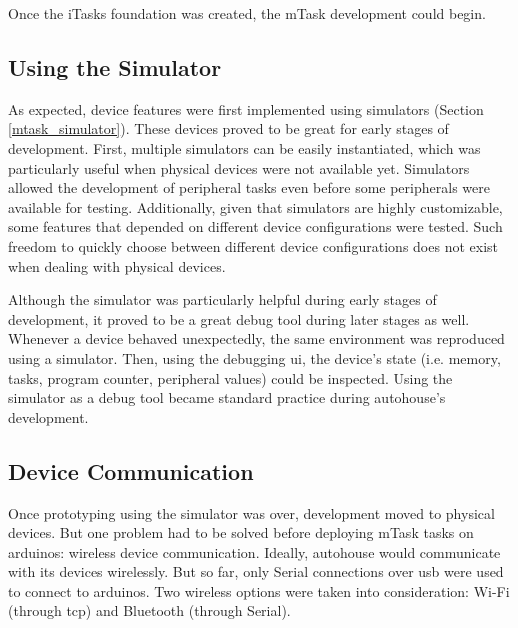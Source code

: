 Once the \gls{iTasks} foundation was created, the \gls{mTask} development could begin.

\subsection{Using the Simulator}
As expected, device features were first implemented using simulators (Section \ref{mtask_simulator}). These devices proved to be great for early stages of development. First, multiple simulators can be easily instantiated, which was particularly useful when physical devices were not available yet. Simulators allowed the development of peripheral tasks even before some peripherals were available for testing. Additionally, given that simulators are highly customizable, some features that depended on different device configurations were tested. Such freedom to quickly choose between different device configurations does not exist when dealing with physical devices.

Although the simulator was particularly helpful during early stages of development, it proved to be a great debug tool during later stages as well. Whenever a device behaved unexpectedly, the same environment was reproduced using a simulator. Then, using the debugging \acs{ui}, the device's state (i.e. memory, tasks, program counter, peripheral values) could be inspected. Using the simulator as a debug tool became standard practice during \gls{autohouse}'s development.

\subsection{Device Communication}
Once prototyping using the simulator was over, development moved to physical devices. But one problem had to be solved before deploying \gls{mTask} tasks on \gls{arduino}s: wireless device communication. Ideally, \gls{autohouse} would communicate with its devices wirelessly. But so far, only Serial connections over \acs{usb} were used to connect to \gls{arduino}s. Two wireless options were taken into consideration: Wi-Fi (through \acs{tcp}) and Bluetooth (through Serial).

